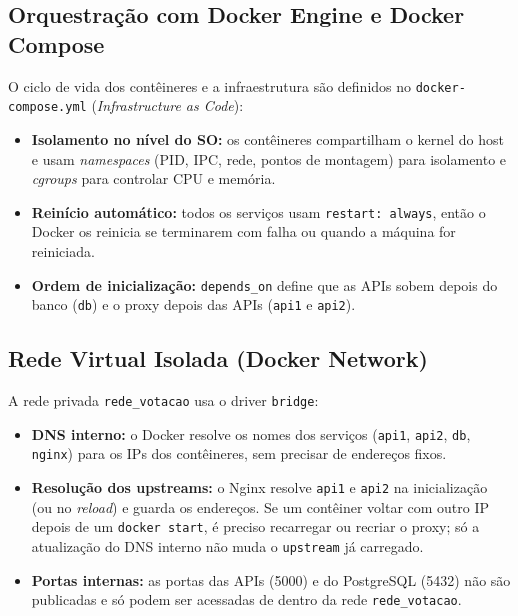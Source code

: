 \documentclass[12pt,a4paper]{article}
\begin{document}
\subsection{Orquestração com Docker Engine e Docker Compose}
O ciclo de vida dos contêineres e a infraestrutura são definidos no \texttt{docker-compose.yml} (\textit{Infrastructure as Code}):
\begin{itemize}
    \item \textbf{Isolamento no nível do SO:} os contêineres compartilham o kernel do host e usam \textit{namespaces} (PID, IPC, rede, pontos de montagem) para isolamento e \textit{cgroups} para controlar CPU e memória.
    \item \textbf{Reinício automático:} todos os serviços usam \texttt{restart: always}, então o Docker os reinicia se terminarem com falha ou quando a máquina for reiniciada.
    \item \textbf{Ordem de inicialização:} \texttt{depends\_on} define que as APIs sobem depois do banco (\texttt{db}) e o proxy depois das APIs (\texttt{api1} e \texttt{api2}).
\end{itemize}

\subsection{Rede Virtual Isolada (Docker Network)}
A rede privada \texttt{rede\_votacao} usa o driver \texttt{bridge}:
\begin{itemize}
    \item \textbf{DNS interno:} o Docker resolve os nomes dos serviços (\texttt{api1}, \texttt{api2}, \texttt{db}, \texttt{nginx}) para os IPs dos contêineres, sem precisar de endereços fixos.
    \item \textbf{Resolução dos upstreams:} o Nginx resolve \texttt{api1} e \texttt{api2} na inicialização (ou no \textit{reload}) e guarda os endereços. Se um contêiner voltar com outro IP depois de um \texttt{docker start}, é preciso recarregar ou recriar o proxy; só a atualização do DNS interno não muda o \texttt{upstream} já carregado.
    \item \textbf{Portas internas:} as portas das APIs (5000) e do PostgreSQL (5432) não são publicadas e só podem ser acessadas de dentro da rede \texttt{rede\_votacao}.
\end{itemize}
\end{document}
